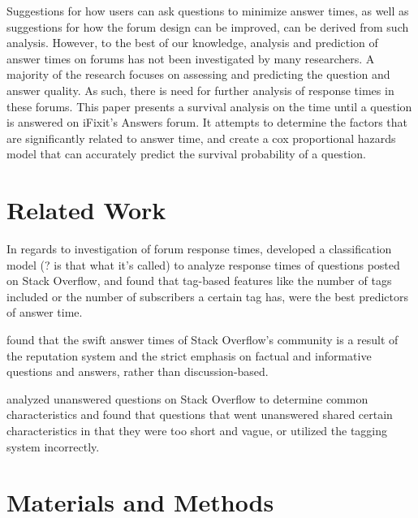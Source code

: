 \documentclass[12pt]{article}
\begin{document}
    Suggestions for how users can ask questions to minimize answer times, as well as suggestions for how the forum design can be improved, can be derived from such analysis. However, to the best of our knowledge, analysis and prediction of answer times on forums has not been investigated by many researchers. A majority of the research focuses on assessing and predicting the question and answer quality. As such, there is need for further analysis of response times in these forums. This paper presents a survival analysis on the time until a question is answered on iFixit's Answers forum. It attempts to determine the factors that are significantly related to answer time, and create a cox proportional hazards model that can accurately predict the survival probability of a question.

\section{Related Work}

    In regards to investigation of forum response times, \citep{Bhat2014} developed a classification model (? is that what it's called) to analyze response times of questions posted on Stack Overflow, and found that tag-based features like the number of tags included or the number of subscribers a certain tag has, were the best predictors of answer time. 

    \citep{Mamykina2011} found that the swift answer times of Stack Overflow's community is a result of the reputation system and the strict emphasis on factual and informative questions and answers, rather than discussion-based. 

    \citep{Asaduzzaman2013} analyzed unanswered questions on Stack Overflow to determine common characteristics and found that questions that went unanswered shared certain characteristics in that they were too short and vague, or utilized the tagging system incorrectly. 

\section{Materials and Methods}
\end{document}
